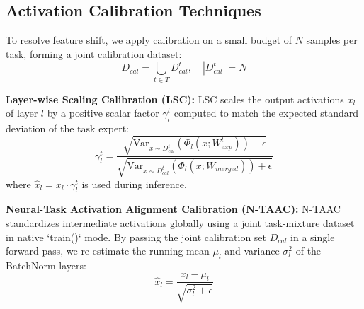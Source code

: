 \documentclass{article}
\theoremstyle{plain}
\theoremstyle{definition}
\theoremstyle{remark}
\begin{document}
\subsection{Activation Calibration Techniques}
To resolve feature shift, we apply calibration on a small budget of $N$ samples per task, forming a joint calibration dataset:
\begin{equation}
    D_{cal} = \bigcup_{t \in T} D_{cal}^t, \quad |D_{cal}^t| = N
\end{equation}

\textbf{Layer-wise Scaling Calibration (LSC):} LSC scales the output activations $x_l$ of layer $l$ by a positive scalar factor $\gamma_l^t$ computed to match the expected standard deviation of the task expert:
\begin{equation}
    \gamma_l^t = \frac{\sqrt{\text{Var}_{x \sim D_{cal}^t}(\Phi_l(x; W_{exp}^t)) + \epsilon}}{\sqrt{\text{Var}_{x \sim D_{cal}^t}(\Phi_l(x; W_{merged})) + \epsilon}}
\end{equation}
where $\hat{x}_l = x_l \cdot \gamma_l^t$ is used during inference.

\textbf{Neural-Task Activation Alignment Calibration (N-TAAC):} N-TAAC standardizes intermediate activations globally using a joint task-mixture dataset in native `train()` mode. By passing the joint calibration set $D_{cal}$ in a single forward pass, we re-estimate the running mean $\mu_l$ and variance $\sigma_l^2$ of the BatchNorm layers:
\begin{equation}
    \hat{x}_l = \frac{x_l - \mu_l}{\sqrt{\sigma_l^2 + \epsilon}}
\end{equation}
\end{document}
